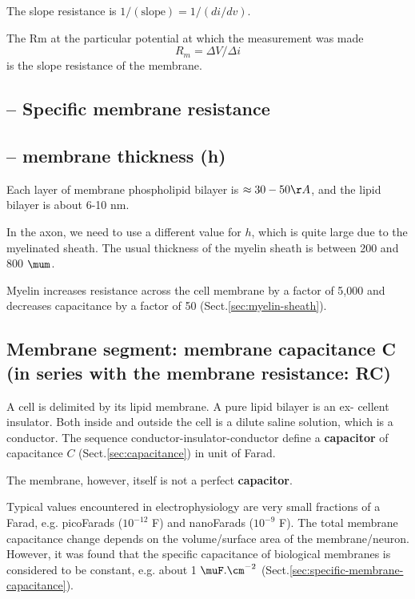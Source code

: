 The slope resistance is $1/(\text{slope}) = 1/(di/dv)$.

The Rm at the particular potential at which the measurement was made 
\begin{equation}
R_m	= \Delta V / \Delta i 
\end{equation}
is the slope resistance of the membrane.


\subsection{-- Specific membrane resistance}
\label{sec:specific-membrane-resistance}



\subsection{-- membrane thickness (h)}
\label{sec:membrane-thickness}

Each layer of membrane phospholipid bilayer is $ \approx 30-50 \AA$, and the 
lipid bilayer is about 6-10 nm. 

In the axon, we need to use a different value for $h$, which is quite large due
to the myelinated sheath. The usual thickness of the myelin sheath is between
200 and 800 $\mum$.

Myelin increases resistance across the cell membrane by a factor of 5,000 and
decreases capacitance by a factor of 50 (Sect.\ref{sec:myelin-sheath}).



\subsection{Membrane segment: membrane capacitance C (in series with the
membrane resistance: RC)}
\label{sec:membrane-capacitance}

A cell is delimited by its lipid membrane. A pure lipid bilayer is an ex-
cellent insulator. Both inside and outside the cell is a dilute saline solution,
which is a conductor. The sequence conductor-insulator-conductor define a
{\bf capacitor} of capacitance $C$ (Sect.\ref{sec:capacitance}) in unit of
Farad.

The membrane, however, itself is not a perfect {\bf capacitor}.


Typical values encountered in electrophysiology are very small fractions of a
Farad, e.g. picoFarads ($10^{-12}$ F) and nanoFarads ($10^{-9}$ F). The total
membrane capacitance change depends on the volume/surface area of the
membrane/neuron. However, it was found that the specific capacitance of
biological membranes is considered to be constant, e.g. about 1 $\muF.\cm^{-2}$
(Sect.\ref{sec:specific-membrane-capacitance}). 


